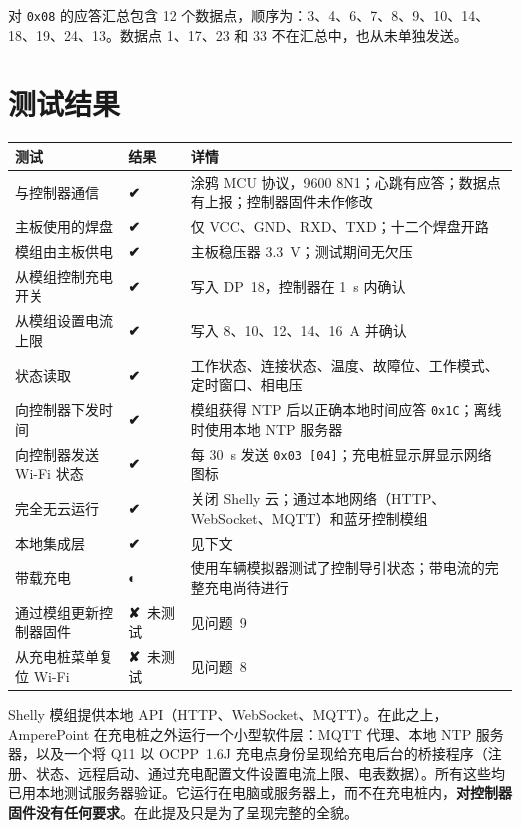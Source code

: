 \documentclass[11pt,a4paper]{article}
\newcommand{\ok}{{\symbolfont\color{apgreen}\textbf{✔}}}
\newcommand{\half}{{\symbolfont\color{apwarn}\textbf{◐}}}
\newcommand{\no}{{\symbolfont\color{apred}\textbf{✘}}}
\newcommand{\hx}[1]{\texttt{#1}}
\begin{document}
对 \hx{0x08} 的应答汇总包含 12 个数据点，顺序为：3、4、6、7、8、9、10、14、18、19、24、13。数据点 1、17、23 和 33 不在汇总中，也从未单独发送。

\section{测试结果}

\begin{longtable}{>{\raggedright\arraybackslash}p{4.2cm}>{\raggedright\arraybackslash}p{1.7cm}>{\raggedright\arraybackslash}p{10.1cm}}
\toprule
\rowcolor{aphead}\textbf{测试} & \textbf{结果} & \textbf{详情} \\
\midrule\endhead
\bottomrule\endfoot
与控制器通信 & \ok & 涂鸦 MCU 协议，9600 8N1；心跳有应答；数据点有上报；控制器固件未作修改 \\
主板使用的焊盘 & \ok & 仅 VCC、GND、RXD、TXD；十二个焊盘开路 \\
模组由主板供电 & \ok & 主板稳压器 3.3~V；测试期间无欠压 \\
从模组控制充电开关 & \ok & 写入 DP~18，控制器在 1~s 内确认 \\
从模组设置电流上限 & \ok & 写入 8、10、12、14、16~A 并确认 \\
状态读取 & \ok & 工作状态、连接状态、温度、故障位、工作模式、定时窗口、相电压 \\
向控制器下发时间 & \ok & 模组获得 NTP 后以正确本地时间应答 \hx{0x1C}；离线时使用本地 NTP 服务器 \\
向控制器发送 Wi-Fi 状态 & \ok & 每 30~s 发送 \hx{0x03 [04]}；充电桩显示屏显示网络图标 \\
完全无云运行 & \ok & 关闭 Shelly 云；通过本地网络（HTTP、WebSocket、MQTT）和蓝牙控制模组 \\
本地集成层 & \ok & 见下文 \\
带载充电 & \half & 使用车辆模拟器测试了控制导引状态；带电流的完整充电尚待进行 \\
通过模组更新控制器固件 & \no\ 未测试 & 见问题~9 \\
从充电桩菜单复位 Wi-Fi & \no\ 未测试 & 见问题~8 \\
\end{longtable}

\begin{apbox}
Shelly 模组提供本地 API（HTTP、WebSocket、MQTT）。在此之上，AmperePoint 在充电桩之外运行一个小型软件层：MQTT 代理、本地 NTP 服务器，以及一个将 Q11 以 OCPP~1.6J 充电点身份呈现给充电后台的桥接程序（注册、状态、远程启动、通过充电配置文件设置电流上限、电表数据）。所有这些均已用本地测试服务器验证。它运行在电脑或服务器上，而不在充电桩内，\textbf{对控制器固件没有任何要求}。在此提及只是为了呈现完整的全貌。
\end{apbox}
\end{document}

